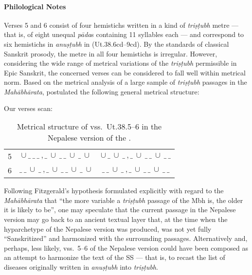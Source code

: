 \paragraph*{Philological Notes}
Verses 5 and 6 consist of four hemistichs written in a kind of \textit{triṣṭubh} metre --- that is, of eight unequal \textit{pāda}s containing 11 syllables each --- and correspond to six hemistichs in \textit{anuṣṭubh} in \cite{vulgate} (Ut.38.6cd--9cd).
By the standards of classical Sanskrit prosody, the metre in all four hemistichs is irregular. However, considering the wide range of metrical variations of the \textit{triṣṭubh} permissible in Epic Sanskrit, the concerned verses can be considered to fall well within metrical norm. Based on the metrical analysis of a large sample of \textit{triṣṭubh} passages in the \textit{Mahābhārata}, \textcite[108]{fitz-2009} postulated the following general metrical structure: 

\begin{table}[h!]
\centering
\caption{\small Summary of table 3 in \cite{fitz-2009}.}
\end{table}

Our verses scan:

\begin{table}[h!]
\centering
\caption{\small Metrical structure of vss.\ Ut.38.5--6 in the Nepalese version of the \SS.}
\begin{tabular}{ c || c | c }
 5 & $\cup\ \_\ \_\ \_\ , \_\ \cup\ \_\ \_\ \cup\ \_\ \cup$ & $\cup\ \_\ \cup\ \_\ , \_\ \cup\  \_\ \_\ \cup\ \_\ \_$ \\ 
 6 & $\_\ \_\ \cup\ \_\ , \_\ \cup\ \_\ \_\ \cup\ \_\ \cup$ & $\_\ \_\ \cup\ \_\ , \_\ \cup\ \_\ \_\ \cup\ \_\ \_$     
\end{tabular}
\end{table}

Following Fitzgerald's hypothesis \parencite[99]{fitz-2009} formulated explicitly with regard to the \textit{Mahābhārata} that ``the more variable a \textit{triṣṭubh} passage of the Mbh is, the older it is likely to be'', one may speculate that the current passage in the Nepalese version may go back to an ancient textual layer that, at the time when the hyparchetype of the Nepalese version was produced, was not yet fully ``Sanskritized'' and harmonized with the surrounding passages. 
Alternatively and, perhaps, less likely, vss.\ 5--6 of the Nepalese version could have been composed as an attempt to harmonize the text of the SS --- that is, to recast the list of diseases originally written in \textit{anuṣṭubh} into \textit{triṣṭubh}. %

